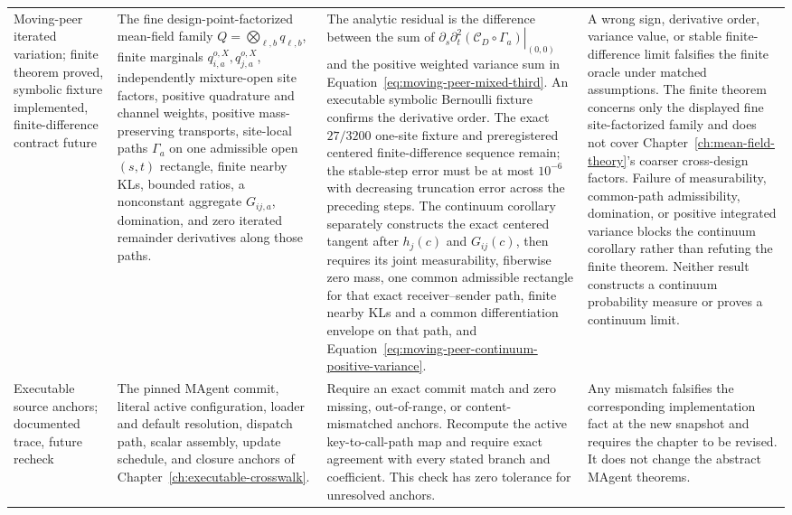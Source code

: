 \begin{longtable}{>{\raggedright\arraybackslash}p{}>{\raggedright\arraybackslash}p{}>{\raggedright\arraybackslash}p{}>{\raggedright\arraybackslash}p{}}
\addlinespace
Moving-peer iterated variation; finite theorem proved, symbolic fixture implemented, finite-difference contract future & The fine design-point-factorized mean-field family \(Q=\bigotimes_{\ell,b}q_{\ell,b}\), finite marginals \(q_{i,a}^{o,X},q_{j,a}^{o,X}\), independently mixture-open site factors, positive quadrature and channel weights, positive mass-preserving transports, site-local paths \(\Gamma_a\) on one admissible open \((s,t)\) rectangle, finite nearby KLs, bounded ratios, a nonconstant aggregate \(G_{ij,a}\), domination, and zero iterated remainder derivatives along those paths. & The analytic residual is the difference between the sum of \(\left.\partial_s\partial_t^2(\mathcal C_D\circ\Gamma_a)\right|_{(0,0)}\) and the positive weighted variance sum in Equation~\eqref{eq:moving-peer-mixed-third}. An executable symbolic Bernoulli fixture confirms the derivative order. The exact \(27/3200\) one-site fixture and preregistered centered finite-difference sequence remain; the stable-step error must be at most \(10^{-6}\) with decreasing truncation error across the preceding steps. The continuum corollary separately constructs the exact centered tangent after \(h_j(c)\) and \(G_{ij}(c)\), then requires its joint measurability, fiberwise zero mass, one common admissible rectangle for that exact receiver--sender path, finite nearby KLs and a common differentiation envelope on that path, and Equation~\eqref{eq:moving-peer-continuum-positive-variance}. & A wrong sign, derivative order, variance value, or stable finite-difference limit falsifies the finite oracle under matched assumptions. The finite theorem concerns only the displayed fine site-factorized family and does not cover Chapter~\ref{ch:mean-field-theory}'s coarser cross-design factors. Failure of measurability, common-path admissibility, domination, or positive integrated variance blocks the continuum corollary rather than refuting the finite theorem. Neither result constructs a continuum probability measure or proves a continuum limit. \\
\addlinespace
Executable source anchors; documented trace, future recheck & The pinned MAgent commit, literal active configuration, loader and default resolution, dispatch path, scalar assembly, update schedule, and closure anchors of Chapter~\ref{ch:executable-crosswalk}. & Require an exact commit match and zero missing, out-of-range, or content-mismatched anchors. Recompute the active key-to-call-path map and require exact agreement with every stated branch and coefficient. This check has zero tolerance for unresolved anchors. & Any mismatch falsifies the corresponding implementation fact at the new snapshot and requires the chapter to be revised. It does not change the abstract MAgent theorems. \\
\end{longtable}
\normalsize


